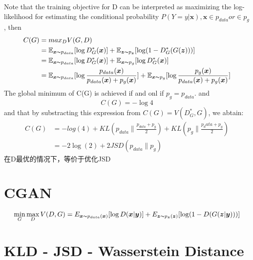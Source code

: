Note that the training objective for D can be interpreted as maximizing the log-likelihood for
estimating the conditional probability $P(Y = y|\boldsymbol{x}), \boldsymbol{x} \in p_{data} or \in p_g$, then
\begin{equation}
    \begin{split}
        C(G) &= max_D V(G, D) \\
        &= \mathbb{E}_{\boldsymbol{x} \thicksim p_{data}}[\log D_G^*(\boldsymbol{x})] + \mathbb{E}_{\boldsymbol{z} \thicksim p_{\boldsymbol{z}}}[\log(1 - D_G^*(G(\boldsymbol{z})))] \\
        &= \mathbb{E}_{\boldsymbol{x} \thicksim p_{data}}[\log D_G^*(\boldsymbol{x})] + \mathbb{E}_{\boldsymbol{x} \thicksim p_{g}}[\log D_G^*(\boldsymbol{x})] \\
        &= \mathbb{E}_{\boldsymbol{x} \thicksim p_{data}}[\log \frac{p_{data}(\boldsymbol{x})}{p_{data}(\boldsymbol{x}) + p_g(\boldsymbol{x})}] + \mathbb{E}_{\boldsymbol{x} \thicksim p_g}[\log \frac{p_g(\boldsymbol{x})}{p_{data}(\boldsymbol{x}) + p_g(\boldsymbol{x})}]
    \end{split}
\end{equation}
The global minimum of C(G) is achieved if and onl if $p_g = p_{data}$. and
\begin{equation}
    C(G) = - \log 4
\end{equation}
and that by substracting this expression from $C(G) = V(D_G^*, G)$, we abtain:
\begin{equation}
    \begin{split}
        C(G) &= -log(4) + KL(p_{data}\| \frac{p_{data} + p_g}{2}) + KL(p_g \| \frac{p_data + p_g}{2}) \\
        &= -2\log(2) + 2JSD(p_{data}\|p_g)
    \end{split}
\end{equation}
在D最优的情况下，等价于优化JSD
\section{CGAN}
\begin{equation}
    \min_G \max_D V(D, G) = E_{\boldsymbol{x} \thicksim p_{data}(\boldsymbol{x})}[\log D(\boldsymbol{x}|\boldsymbol{y})] + E_{\boldsymbol{z} \thicksim p_{\boldsymbol{z}}(\boldsymbol{z})}[\log (1 - D(G(\boldsymbol{z}|\boldsymbol{y})))]
\end{equation}


\section{KLD - JSD - Wasserstein Distance}
